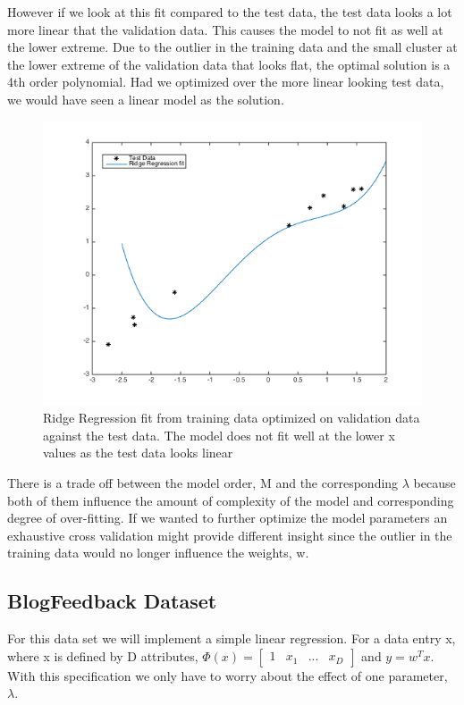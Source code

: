 \documentclass[10pt,twocolumn]{article}
\begin{document}
However if we look at this fit compared to the test data, the test data looks a lot more linear that the validation data. This causes the model to not fit as well at the lower extreme.  Due to the outlier in the training data and the small cluster at the lower extreme of the validation data that looks flat, the optimal solution is a 4th order polynomial. Had we optimized over the more linear looking test data, we would have seen a linear model as the solution. 

\begin{figure}[H]
\center
\includegraphics[scale =.4]{testplot.png}
\caption{Ridge Regression fit from training data optimized on validation data against the test data. The model does not fit well at the lower x values as the test data looks linear }
\end{figure}

 There is a trade off between the model order, M and the corresponding $\lambda$ because both of them influence the amount of  complexity of the model and corresponding  degree of over-fitting.  If we wanted to further optimize the model parameters an exhaustive cross validation might provide different insight since the outlier in the training data would no longer influence the weights, w. 

\subsection*{ BlogFeedback Dataset}
For this data set we will implement a simple linear regression. For a data entry x, where x is defined by D attributes, $\Phi(x)= \begin{bmatrix} 1 &  x_1 & ... & x_D \end{bmatrix}$ and $y = w^T x$. With this specification we only have to worry about the effect of one parameter, $\lambda$. 
\end{document}
